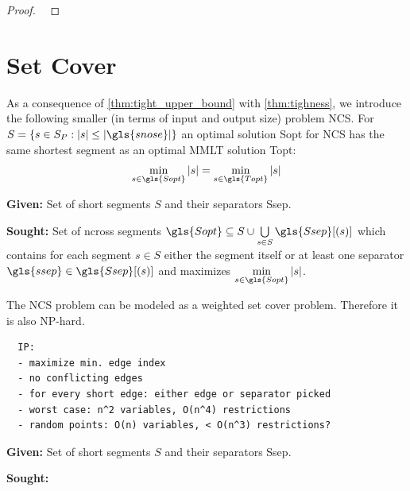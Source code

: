 \begin{proof}
  \ 
\end{proof}

\section{Set Cover}

As a consequence of \cref{thm:tight_upper_bound} with 
\cref{thm:tighness}, we introduce the following smaller (in terms
of input and output size) problem \gls{NCS}.
For \(S = \{s \in S_P : |s| \leq |\gls{snose}|\}\) an optimal 
solution \gls{Sopt} for \gls{NCS} has the same shortest segment 
as an optimal \gls{MMLT} solution \gls{Topt}:
\[
  \min\limits_{s \in \gls{Sopt}} |s|
  = \min\limits_{s \in \gls{Topt}} |s|
\]

\begin{problem}
  \hfill
  \begin{labeling}{\hspace{4em}}
    \item[\textbf{Given:}]
      Set of short segments \(S\) and their separators \gls{Ssep}.
    \item[\textbf{Sought:}]
      Set of \gls{ncross} segments \(\gls{Sopt} \subseteq S \cup
      \bigcup\limits_{s \in S} \gls{Ssep}[(s)] \) which contains
      for each segment \(s \in S\) either the segment itself or at
      least one separator \(\gls{ssep} \in \gls{Ssep}[(s)]\) and
      maximizes \(\min\limits_{s \in \gls{Sopt}} |s|\).
  \end{labeling}
\end{problem}

The \gls{NCS} problem can be modeled as a weighted set cover problem. 
Therefore it is also NP-hard.

\begin{verbatim}
  IP:
  - maximize min. edge index
  - no conflicting edges
  - for every short edge: either edge or separator picked
  - worst case: n^2 variables, O(n^4) restrictions
  - random points: O(n) variables, < O(n^3) restrictions?
\end{verbatim}

\begin{problem}
  \hfill
  \begin{labeling}{\hspace{4em}}
    \item[\textbf{Given:}]
      Set of short segments \(S\) and their separators \gls{Ssep}.  
    \item[\textbf{Sought:}]
  \end{labeling}
\end{problem}


